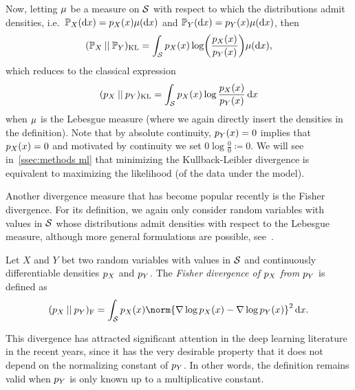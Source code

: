 Now, letting \( \mu \) be a measure on \( \mathcal{S} \) with respect to which the distributions admit densities, i.e.\ \( \mathbb{P}_{X}(\mathrm{d}x) = p_{X}(x)\mu(\mathrm{d}x) \) and \( \mathbb{P}_{Y}(\mathrm{d}x) = p_{Y}(x)\mu(\mathrm{d}x) \), then
\begin{equation}
	(\mathbb{P}_{X}\mathbin{||}\mathbb{P}_{Y})_{\mathrm{KL}} = \int_{\mathcal{S}} p_{X}(x) \log\biggl( \frac{p_{X}(x)}{p_{Y}(x)} \biggr) \mu(\mathrm{d}x),
\end{equation}
which reduces to the classical expression
\begin{equation}
	(p_{X}\mathbin{||}p_{Y})_{\mathrm{KL}} = \int_{\mathcal{S}} p_{X}(x) \log \frac{p_{X}(x)}{p_{Y}(x)}\,\mathrm{d}x
	\label{eq:kullback leibler densities}
\end{equation}
when \( \mu \) is the Lebesgue measure (where we again directly insert the densities in the definition).
Note that by absolute continuity, \( p_{Y}(x) = \num{0} \) implies that \( p_{X}(x) = \num{0} \) and motivated by continuity we set \( \num{0} \log \frac{\num{0}}{\num{0}} \coloneqq \num{0} \).
We will see in~\cref{ssec:methods ml} that minimizing the Kullback-Leibler divergence is equivalent to maximizing the likelihood (of the data under the model).

Another divergence measure that has become popular recently is the Fisher divergence.
For its definition, we again only consider random variables with values in \( \mathcal{S} \) whose distributions admit densities with respect to the Lebesgue measure, although more general formulations are possible, see~\cite[equation 8]{OTTO2000361}.
\begin{definition}%
	\label{def:fisher divergence}
	Let \( X \) and \( Y \) bet two random variables with values in \( \mathcal{S} \) and continuously differentiable densities \( p_{X} \) and \( p_{Y} \).
	The \emph{Fisher divergence of \( p_{X} \) from \( p_{Y} \)} is defined as
	\begin{equation}
		\Fisher{\DensityFunction_{X}}{\DensityFunction_{Y}} = \int_{\ASet} \DensityFunction_{X}(x) \norm{\nabla \log \DensityFunction_{X}(x) - \nabla \log \DensityFunction_{Y}(x)}^{\num{2}}\,\mathrm{d}x.
	\end{equation}
\end{definition}
This divergence has attracted significant attention in the deep learning literature in the recent years, since it has the very desirable property that it does not depend on the normalizing constant of \( p_{Y} \).
In other words, the definition remains valid when \( p_{Y} \) is only known up to a multiplicative constant.

